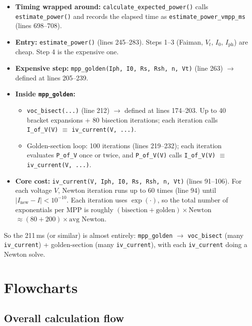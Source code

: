 \documentclass[11pt,a4paper]{article}
\begin{document}
\begin{itemize}
  \item \textbf{Timing wrapped around:} \texttt{calculate\_expected\_power()} calls \texttt{estimate\_power()} and records the elapsed time as \texttt{estimate\_power\_vmpp\_ms} (lines 698--708).
  \item \textbf{Entry:} \texttt{estimate\_power()} (lines 245--283). Steps 1--3 (Faiman, \(V_t\), \(I_0\), \(I_{\mathrm{ph}}\)) are cheap. Step 4 is the expensive one.
  \item \textbf{Expensive step:} \texttt{mpp\_golden(Iph, I0, Rs, Rsh, n, Vt)} (line 263) \(\rightarrow\) defined at lines 205--239.
  \item \textbf{Inside \texttt{mpp\_golden}:}
  \begin{itemize}
    \item \texttt{voc\_bisect(...)} (line 212) \(\rightarrow\) defined at lines 174--203. Up to 40 bracket expansions + 80 bisection iterations; each iteration calls \texttt{I\_of\_V(V)} \(\equiv\) \texttt{iv\_current(V, ...)}.
    \item Golden-section loop: 100 iterations (lines 219--232); each iteration evaluates \texttt{P\_of\_V} once or twice, and \texttt{P\_of\_V(V)} calls \texttt{I\_of\_V(V)} \(\equiv\) \texttt{iv\_current(V, ...)}.
  \end{itemize}
  \item \textbf{Core cost:} \texttt{iv\_current(V, Iph, I0, Rs, Rsh, n, Vt)} (lines 91--106). For each voltage \(V\), Newton iteration runs up to 60 times (line 94) until \(|I_{\mathrm{new}} - I| < 10^{-10}\). Each iteration uses \(\exp(\cdot)\), so the total number of exponentials per MPP is roughly \((\text{bisection} + \text{golden})\times \text{Newton}\) \(\approx (80 + 200)\times \text{avg Newton}\).
\end{itemize}

So the 211\,ms (or similar) is almost entirely: \texttt{mpp\_golden} \(\to\) \texttt{voc\_bisect} (many \texttt{iv\_current}) + golden-section (many \texttt{iv\_current}), with each \texttt{iv\_current} doing a Newton solve.

\section{Flowcharts}

\subsection{Overall calculation flow}
\end{document}
